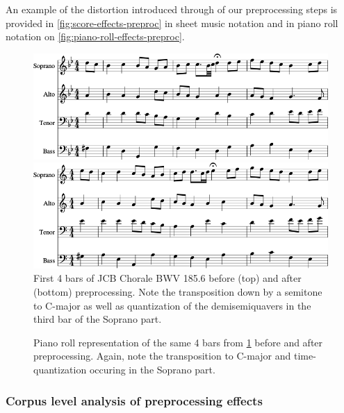 An example of the distortion introduced through of our preprocessing steps is
provided in \vref{fig:score-effects-preproc} in sheet music notation and in
piano roll notation on \vref{fig:piano-roll-effects-preproc}.
\begin{figure}[tb]
    \centering
    \includegraphics[width=0.8\linewidth]{bwv185-6-original-score-1.png}

    \vspace{1.5cm}

    \includegraphics[width=0.8\linewidth]{bwv185-6-preproc-score-1.png}
    \caption{First 4 bars of JCB Chorale BWV 185.6 before (top) and after
      (bottom) preprocessing. Note the transposition down by a semitone to
      C-major as well as quantization of the demisemiquavers in the third bar of
    the Soprano part.}
    \label{fig:score-effects-preproc}
\end{figure}

\begin{figure}[tb]
    \centering
        
        
    \caption{Piano roll representation of the same 4 bars from \cref{fig:score-effects-preproc}
      before and after preprocessing. Again, note the transposition to C-major
      and time-quantization occuring in the Soprano part.}
    \label{fig:piano-roll-effects-preproc}
\end{figure}

\subsubsection{Corpus level analysis of preprocessing effects}

